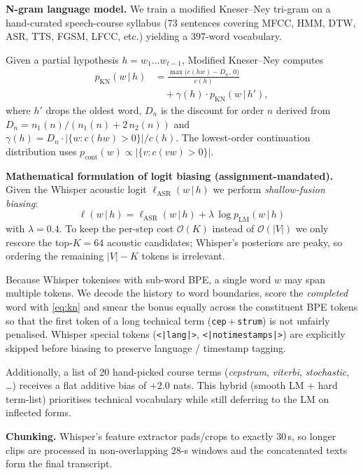 \documentclass[conference]{IEEEtran}
\begin{document}
\textbf{N-gram language model.}
We train a modified Kneser--Ney tri-gram
\cite{chen1998empirical,heafield2011kenlm} on a hand-curated
speech-course syllabus (73 sentences covering MFCC, HMM, DTW, ASR,
TTS, FGSM, LFCC, etc.) yielding a 397-word vocabulary.

Given a partial hypothesis $h=w_1\ldots w_{t-1}$, Modified Kneser--Ney
computes
\begin{align}
p_\text{KN}(w\,|\,h)
&= \frac{\max\!\bigl(c(hw)-D_n,\ 0\bigr)}{c(h)}\nonumber\\
&\quad+ \gamma(h)\cdot p_\text{KN}(w\,|\,h'),
\label{eq:kn}
\end{align}
where $h'$ drops the oldest word, $D_n$ is the discount for order
$n$ derived from
$D_n = n_1(n)/(n_1(n)+2\,n_2(n))$ and
$\gamma(h) = D_n\cdot |\{w:c(hw)>0\}| / c(h)$. The lowest-order
continuation distribution uses
$p_\text{cont}(w) \propto |\{v:c(vw)>0\}|$.

\textbf{Mathematical formulation of logit biasing
(assignment-mandated).}
Given the Whisper acoustic logit $\ell_\text{ASR}(w\,|\,h)$ we
perform \textit{shallow-fusion biasing}:
\begin{equation}
\boxed{\;\ell(w\,|\,h) = \ell_\text{ASR}(w\,|\,h) + \lambda\,\log p_\text{LM}(w\,|\,h)\;}
\label{eq:bias}
\end{equation}
with $\lambda=0.4$. To keep the per-step cost
$\mathcal{O}(K)$ instead of $\mathcal{O}(|V|)$ we only rescore the
top-$K=64$ acoustic candidates; Whisper's posteriors are peaky, so
ordering the remaining $|V|-K$ tokens is irrelevant.

Because Whisper tokenises with sub-word BPE, a single word $w$ may
span multiple tokens. We decode the history to word boundaries,
score the \textit{completed} word with \eqref{eq:kn} and smear the
bonus equally across the constituent BPE tokens so that the first
token of a long technical term (\texttt{cep}\,+\,\texttt{strum}) is
not unfairly penalised. Whisper special tokens (\texttt{<|lang|>},
\texttt{<|notimestamps|>}) are explicitly skipped before biasing to
preserve language / timestamp tagging.

Additionally, a list of 20 hand-picked course terms
(\textit{cepstrum}, \textit{viterbi}, \textit{stochastic}, \ldots)
receives a flat additive bias of $+2.0$ nats. This hybrid (smooth
LM + hard term-list) prioritises technical vocabulary while still
deferring to the LM on inflected forms.

\textbf{Chunking.}
Whisper's feature extractor pads/crops to exactly 30\,s, so longer
clips are processed in non-overlapping 28-s windows and the
concatenated texts form the final transcript.
\end{document}
